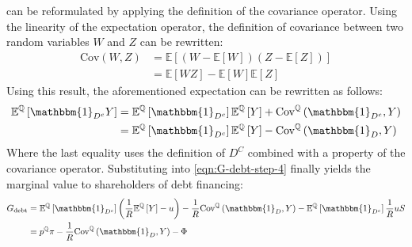 \documentclass[../main.tex]{subfiles}
\begin{document}
        can be reformulated by applying the definition of the covariance operator.
        Using the linearity of the expectation operator,
        the definition of covariance between two random variables $W$ and $Z$ can be rewritten:
            \begin{align}
                \text{Cov}\left(W, Z\right) &= 
                \mathbb{E}\left[
                    (W - \mathbb{E}\left[W\right])
                    (Z - \mathbb{E}\left[Z\right])
                \right] \nonumber\\
                &=
                \mathbb{E}\left[WZ\right]
                - \mathbb{E}\left[W\right] \mathbb{E}\left[Z\right] \nonumber
            \end{align}
        Using this result, the aforementioned expectation can be rewritten as follows:
            \begin{align}
                \mathbb{E}^{\mathbb{Q}}\left[
                    \mathbbm{1}_{D^{c}}Y
                \right]
                &=
                \mathbb{E}^{\mathbb{Q}}\left[\mathbbm{1}_{D^{c}}\right] 
                \mathbb{E}^{\mathbb{Q}}\left[Y\right] 
                + 
                \text{Cov}^{\mathbb{Q}}\left(\mathbbm{1}_{D^{c}}, Y\right) 
                \nonumber\\
                &=
                \mathbb{E}^{\mathbb{Q}}\left[\mathbbm{1}_{D^{c}}\right] 
                \mathbb{E}^{\mathbb{Q}}\left[Y\right] 
                - 
                \text{Cov}^{\mathbb{Q}}\left(\mathbbm{1}_{D}, Y\right) 
            \end{align}
        Where the last equality uses the definition of $D^{C}$ combined with a property of the covariance operator.
        Substituting into \cref{eqn:G-debt-step-4} finally yields the marginal value to shareholders of debt financing:
            \begin{align}
                G_{\text{debt}} &=
                \mathbb{E}^{\mathbb{Q}}\left[\mathbbm{1}_{D^{c}}\right] 
                \left(
                    \discountfactor
                    \mathbb{E}^{\mathbb{Q}}\left[Y\right] 
                    - u
                \right)
                -
                \discountfactor
                \text{Cov}^{\mathbb{Q}}\left(\mathbbm{1}_{D}, Y\right) 
                - 
                \mathbb{E}^{\mathbb{Q}}\left[
                    \mathbbm{1}_{D^{c}}
                \right] \discountfactor u S
                \nonumber \\
                &= 
                p^{\mathbb{Q}} \pi 
                - \discountfactor 
                \text{Cov}^{\mathbb{Q}}\left(
                    \mathbbm{1}_{D}, 
                    Y
                \right) 
                - \Phi
                \label{eqn:marginal-shareholder-value-debt-financing}
            \end{align}
\end{document}

